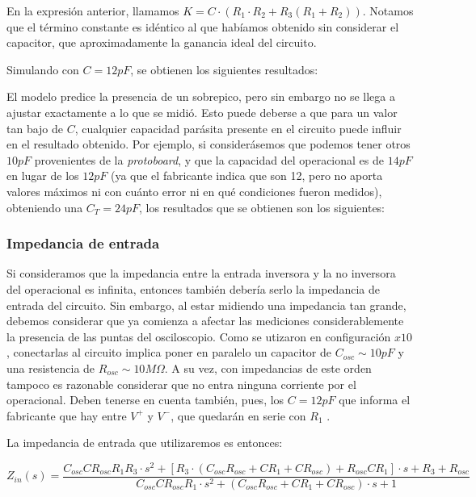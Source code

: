 \documentclass[../../main.tex]{subfiles}
\begin{document}
En la expresi\'on anterior, llamamos $K = C\cdot ( R_1\cdot R_2 + R_3 (R_1 +R_2 ))$. Notamos que el t\'ermino constante es id\'entico al que hab\'iamos obtenido sin considerar el capacitor, que aproximadamente la ganancia ideal del circuito. \par

Simulando con $C=12pF$, se obtienen los siguientes resultados:


El modelo predice la presencia de un sobrepico, pero sin embargo no se llega a ajustar exactamente a lo que se midi\'o. Esto puede deberse a que para un valor tan bajo de $C$, cualquier capacidad par\'asita presente en el circuito puede influir en el resultado obtenido. Por ejemplo, si consider\'asemos que podemos tener otros $10pF$ provenientes de la \textit{protoboard}, y que la capacidad del operacional es de $14pF$ en lugar de los $12pF$ (ya que el fabricante indica que son 12, pero no aporta valores m\'aximos ni con cu\'anto error ni en qu\'e condiciones fueron medidos), obteniendo una $C_T = 24pF$, los resultados que se obtienen son los siguientes:



\subsubsection{Impedancia de entrada}
Si consideramos que la impedancia entre la entrada inversora y la no inversora del operacional es infinita, entonces tambi\'en deber\'ia serlo la impedancia de entrada del circuito. Sin embargo, al estar midiendo una impedancia tan grande, debemos considerar que ya comienza a afectar las mediciones considerablemente la presencia de las puntas del osciloscopio. Como se utizaron en configuraci\'on $x10$, conectarlas al circuito implica poner en paralelo un capacitor de $C_{osc}\sim10pF$ y una resistencia de $R_{osc}\sim10M\Omega$. A su vez, con impedancias de este orden tampoco es razonable considerar que no entra ninguna corriente por el operacional. Deben tenerse en cuenta tambi\'en, pues, los $C=12pF$ que informa el fabricante que hay entre $V^+$ y $V^-$, que quedar\'an en serie con $R_1$ .


La impedancia de entrada que utilizaremos es entonces:

\begin{equation} Z_{in}(s) = \frac{ C_{osc} C R_{osc} R_1 R_3 \cdot s^2 + [ R_3 \cdot (C_{osc} R_{osc} + C R_1 + C R_{osc})  + R_{osc} C R_1] \cdot s + R_3 + R_{osc} }
						{ C_{osc} C R_{osc} R_1 \cdot s^2 + (C_{osc} R_{osc} + C R_1 + C R_{osc}) \cdot s + 1}\end{equation}
\end{document}
